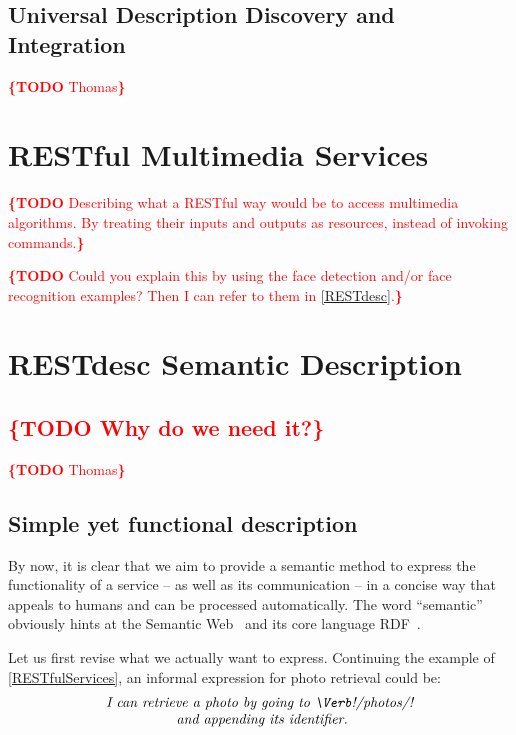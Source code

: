 \documentclass[runningheads,a4paper, twocolumn]{llncs}
\newcommand{\todo}[1]{\noindent\textcolor{red}{{\bf \{TODO} #1{\bf \}}}}
\begin{document}
\subsection{Universal Description Discovery and Integration}
\todo{Thomas}

\section{RESTful Multimedia Services}
\label{RESTfulServices}
\todo{Describing what a RESTful way would be to access multimedia algorithms. By treating their inputs and outputs as resources, instead of invoking commands.}

\todo{Could you explain this by using the face detection and/or face recognition examples? Then I can refer to them in \autoref{RESTdesc}.}

\section{RESTdesc Semantic Description}
\label{RESTdesc}
\subsection{\todo{Why do we need it?}}
\todo{Thomas}

\subsection{Simple yet functional description}
By now, it is clear that we aim to provide a semantic method to express the functionality of a service -- as well as its communication -- in a concise way that appeals to humans and can be processed automatically. The word ``semantic'' obviously hints at the Semantic Web~\cite{SemanticWeb} and its core language RDF~\cite{RDF}.

Let us first revise what we actually want to express. Continuing the example of \autoref{RESTfulServices}, an informal expression for photo retrieval could be:
\begin{multline}\label{eq:Informal}
	\textit{I can retrieve a photo by going to \Verb!/photos/!}\\[-.3em]
	\textit{ and appending its identifier.}
\end{multline}
\end{document}
